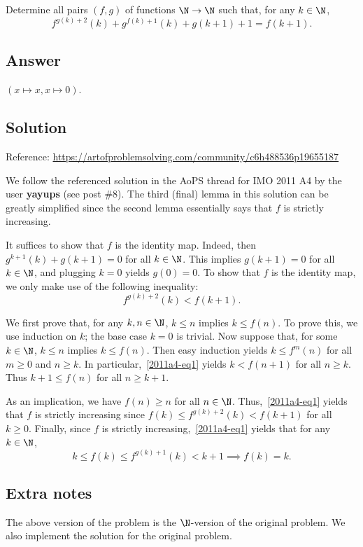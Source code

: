 Determine all pairs $(f, g)$ of functions $\N \to \N$ such that, for any $k \in \N$,
\[ f^{g(k) + 2}(k) + g^{f(k) + 1}(k) + g(k + 1) + 1 = f(k + 1). \]



\subsection*{Answer}

$(x \mapsto x, x \mapsto 0)$.



\subsection*{Solution}

Reference: \url{https://artofproblemsolving.com/community/c6h488536p19655187}

We follow the referenced solution in the AoPS thread for IMO 2011 A4 by the user \textbf{yayups} (see post \#8).
The third (final) lemma in this solution can be greatly simplified since the second lemma essentially says that $f$ is strictly increasing.

It suffices to show that $f$ is the identity map.
Indeed, then $g^{k + 1}(k) + g(k + 1) = 0$ for all $k \in \N$.
This implies $g(k + 1) = 0$ for all $k \in \N$, and plugging $k = 0$ yields $g(0) = 0$.
To show that $f$ is the identity map, we only make use of the following inequality:
\[ f^{g(k) + 2}(k) < f(k + 1). \tag{1}\label{2011a4-eq1} \]

We first prove that, for any $k, n \in \N$, $k \leq n$ implies $k \leq f(n)$.
To prove this, we use induction on $k$; the base case $k = 0$ is trivial.
Now suppose that, for some $k \in \N$, $k \leq n$ implies $k \leq f(n)$.
Then easy induction yields $k \leq f^m(n)$ for all $m \geq 0$ and $n \geq k$.
In particular,~\eqref{2011a4-eq1} yields $k < f(n + 1)$ for all $n \geq k$.
Thus $k + 1 \leq f(n)$ for all $n \geq k + 1$.

As an implication, we have $f(n) \geq n$ for all $n \in \N$.
Thus,~\eqref{2011a4-eq1} yields that $f$ is strictly increasing since $f(k) \leq f^{g(k) + 2}(k) < f(k + 1)$ for all $k \geq 0$.
Finally, since $f$ is strictly increasing,~\eqref{2011a4-eq1} yields that for any $k \in \N$,
\[ k \leq f(k) \leq f^{g(k) + 1}(k) < k + 1 \implies f(k) = k. \]



\subsection*{Extra notes}

The above version of the problem is the $\N$-version of the original problem.
We also implement the solution for the original problem.


